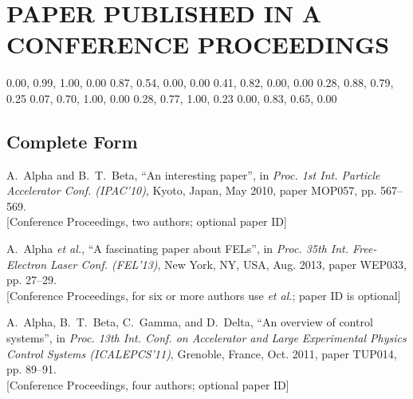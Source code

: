 \documentclass[a4paper,
              ]{jacow}
\begin{document}
\patchcmd{}
\section{PAPER PUBLISHED IN A CONFERENCE PROCEEDINGS}

\definecolor{jred}{cmyk}  {0.00, 0.99, 1.00, 0.00}
\definecolor{jblue}{cmyk} {0.87, 0.54, 0.00, 0.00}
\definecolor{jvio}{cmyk}  {0.41, 0.82, 0.00, 0.00}
\definecolor{jbook}{cmyk} {0.28, 0.88, 0.79, 0.25}
\definecolor{jrept}{cmyk} {0.07, 0.70, 1.00, 0.00}
\definecolor{jmanu}{cmyk} {0.28, 0.77, 1.00, 0.23}
\definecolor{junpu}{cmyk} {0.00, 0.83, 0.65, 0.00}


\subsection{Complete Form}

\begin{thebibliography}{9} %
	
	A.~Alpha and B.~T.~Beta, “An interesting paper”, 
	in \textit{Proc. 1st Int. Particle Accelerator Conf. (IPAC’10)}, 
	Kyoto, Japan, May 2010, 
	paper MOP057, pp. 567--569.\\
	\textcolor{jgreen}{[Conference Proceedings, two authors; optional paper ID]}

	A.~Alpha \emph{et al.}, 
	“A fascinating paper about FELs”, 
	in \emph{Proc. 35th Int. Free-Electron Laser Conf. (FEL’13)}, 
	New York, NY, USA, Aug. 2013, 
	paper WEP033, pp. 27--29.\\
	\textcolor{jgreen}{[Conference Proceedings, for six or more authors use \emph{et al.};	
		paper ID is optional]}
	
	A.~Alpha, B.~T.~Beta, C.~Gamma, and D.~Delta, 
	“An overview of control systems”, 
	in \emph{Proc. 13th Int. Conf. on Accelerator and Large Experimental Physics Control Systems (ICALEPCS’11)}, Grenoble, France, Oct. 2011, 
	paper TUP014, pp. 89--91.\\
	\textcolor{jgreen}{[Conference Proceedings, four authors; optional paper ID]}
\end{thebibliography}
\end{document}

